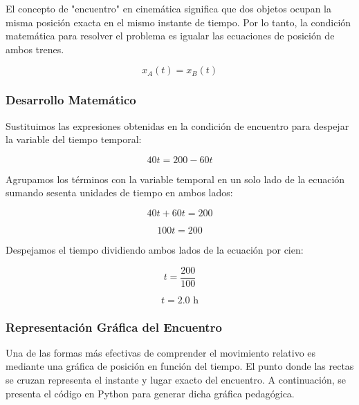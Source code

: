 \documentclass[12pt, a4paper]{article}
\begin{document}
El concepto de "encuentro" en cinemática significa que dos objetos ocupan la misma posición exacta en el mismo instante de tiempo. Por lo tanto, la condición matemática para resolver el problema es igualar las ecuaciones de posición de ambos trenes.

\begin{equation}
x_A(t) = x_B(t)
\end{equation}

\subsubsection*{Desarrollo Matemático}

Sustituimos las expresiones obtenidas en la condición de encuentro para despejar la variable del tiempo temporal:

\begin{equation}
40t = 200 - 60t
\end{equation}

Agrupamos los términos con la variable temporal en un solo lado de la ecuación sumando sesenta unidades de tiempo en ambos lados:

\begin{equation}
40t + 60t = 200
\end{equation}

\begin{equation}
100t = 200
\end{equation}

Despejamos el tiempo dividiendo ambos lados de la ecuación por cien:

\begin{equation}
t = \frac{200}{100}
\end{equation}

\begin{equation}
t = 2.0 \text{ h}
\end{equation}

\subsubsection*{Representación Gráfica del Encuentro}

Una de las formas más efectivas de comprender el movimiento relativo es mediante una gráfica de posición en función del tiempo. El punto donde las rectas se cruzan representa el instante y lugar exacto del encuentro. A continuación, se presenta el código en Python para generar dicha gráfica pedagógica.
\end{document}
